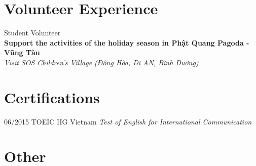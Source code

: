 \documentclass[]{friggeri-cv}
\begin{document}
\section{Volunteer Experience}
Student Volunteer\\
\textbf{Support the activities of the holiday season in Phật Quang Pagoda - Vũng Tàu}\\
\emph{Visit SOS Children's Village (Đông Hòa, Dĩ AN, Bình Dương)}
\\

\section{Certifications}
\begin{entrylist}
  \entry
    {06/2015}
    {TOEIC}
    {IIG Vietnam}
    {\emph{Test of English for International Communication}}
\end{entrylist}
\section{Other}
\end{document}
